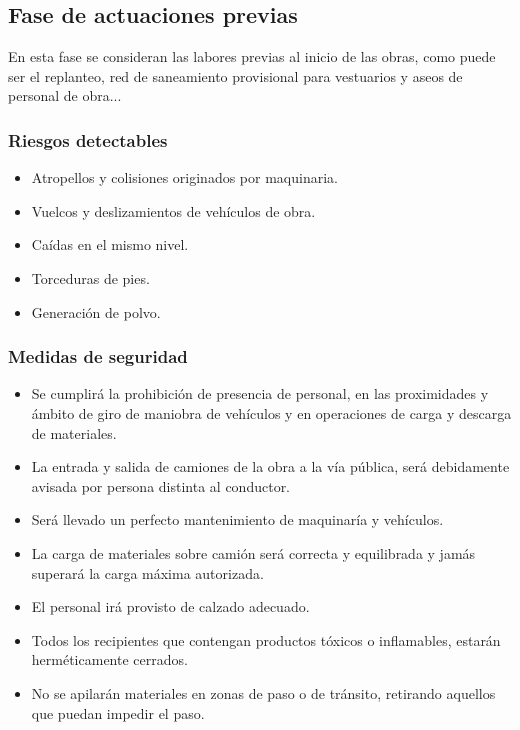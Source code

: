 \subsection{Fase de actuaciones previas}
\label{subsec:sys-riesgosActuaciones}
En esta fase se consideran las labores previas al inicio de las obras, como puede ser el replanteo, red de saneamiento provisional para vestuarios y aseos de personal de obra...
\subsubsection{Riesgos detectables}
\label{subsubsec:sysActuaciones-RD}
\begin{itemize}
    \item Atropellos y colisiones originados por maquinaria.
    \item Vuelcos y deslizamientos de vehículos de obra.
    \item Caídas en el mismo nivel.
    \item Torceduras de pies.
    \item Generación de polvo.
\end{itemize}
\subsubsection{Medidas de seguridad}
\label{subsubsec:sysActuaciones-MS}
\begin{itemize}
    \item Se cumplirá la prohibición de presencia de personal, en las proximidades y ámbito de giro de maniobra de vehículos y en operaciones de carga y descarga de materiales.
    \item La entrada y salida de camiones de la obra a la vía pública, será debidamente avisada por persona distinta al conductor.
    \item Será llevado un perfecto mantenimiento de maquinaría y vehículos.
    \item La carga de materiales sobre camión será correcta y equilibrada y jamás superará la carga máxima autorizada.
    \item El personal irá provisto de calzado adecuado.
    \item Todos los recipientes que contengan productos tóxicos o inflamables, estarán herméticamente cerrados.
    \item No se apilarán materiales en zonas de paso o de tránsito, retirando aquellos que puedan impedir el paso.
\end{itemize}
